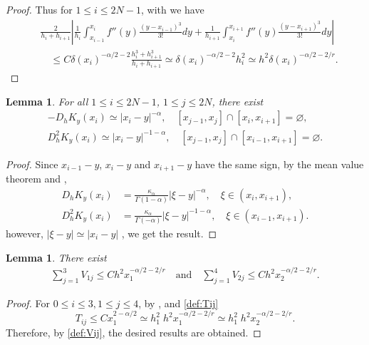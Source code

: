\documentclass{amsart}
\newtheorem{lemma}[theorem]{Lemma}
\theoremstyle{definition}
\theoremstyle{remark}
\numberwithin{equation}{section}
\begin{document}
\begin{proof}
  Thus for \(1\le i\le 2N-1\), with  we have
  \begin{equation*}
    \begin{aligned}
      & \frac{2}{h_i + h_{i+1}} \left| \frac{1}{h_i} \int_{x_{i-1}}^{x_{i}} f''(y) \frac{(y-x_{i-1})^3}{3!} dy + \frac{1}{h_{i+1}} \int_{x_{i}}^{x_{i+1}} f''(y) \frac{(y-x_{i+1})^3}{3!} dy \right| \\
       & \quad \le C \delta(x_i)^{-\alpha/2-2} \frac{h_i^3 + h_{i+1}^3}{h_i + h_{i+1}} 
       \simeq \delta(x_i)^{-\alpha/2-2} h_i^2 \simeq  h^2 \delta(x_i)^{-\alpha/2-2/r}.
    \end{aligned}
  \end{equation*}
\end{proof}

\begin{lemma} \label{lmm:Dh2Kyxi}
  For all \(1 \le i \le 2N-1\), \(1\le j \le 2N\), there exist
  \begin{gather*}
    -D_h K_y (x_i) \simeq | x_i - y|^{-\alpha} ,\quad [x_{j-1}, x_{j}] \cap [x_i, x_{i+1}] = \varnothing , \\
    D_h^2 K_y (x_i) \simeq | x_i - y |^{-1-\alpha}, \quad [x_{j-1}, x_{j}] \cap [x_{i-1}, x_{i+1}] = \varnothing.
  \end{gather*}
\end{lemma}
\begin{proof}
  Since \(x_{i-1}-y\), \(x_{i}-y\) and \(x_{i+1}-y\) have the same sign, by the mean value theorem and ,
  \begin{equation*}
    \begin{aligned}
      D_h K_y (x_i) &= \frac{\kappa_\alpha}{\Gamma(1-\alpha)}|\xi-y|^{-\alpha}, \quad \xi\in (x_{i}, x_{i+1})  ,\\
      D_h^2 K_y (x_i) & = \frac{\kappa_\alpha}{\Gamma(-\alpha)}|\xi-y|^{-1-\alpha}, \quad \xi\in (x_{i-1}, x_{i+1})  .
    \end{aligned}
  \end{equation*}
  however, \(|\xi-y| \simeq |x_i-y|\) , we get the result.
\end{proof}


\begin{lemma} \label{lmm:sumSij13}
  There exist
  \begin{gather*}
    \sum_{j=1}^{3} V_{1j} \le C h^2 x_1^{-\alpha/2-2/r}  \quad \text{and} \quad
    \sum_{j=1}^{4} V_{2j} \le C h^2 x_2^{-\alpha/2-2/r}  .
  \end{gather*}
\end{lemma}
\begin{proof}
  For \(0\le i \le 3, 1\le j \le 4\), by ,  and \eqref{def:Tij}
  \begin{equation*}
    T_{ij} \le C x_1^{2-\alpha/2} \simeq h_1^2 \; h^2 x_1^{-\alpha/2-2/r} \simeq h_1^2 \; h^2 x_2^{-\alpha/2-2/r} .
  \end{equation*}
  Therefore, by \eqref{def:Vij}, the desired results are obtained.
\end{proof}
\end{document}
